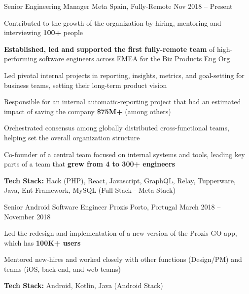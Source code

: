 \documentclass[]{awesome-cv}
\begin{document}
	
\vspace{-8mm}
\begin{cventries}

\vspace{-2mm}

\cventry
	{Senior Engineering Manager}
	{Meta}
	{Spain, Fully-Remote}
	{Nov 2018 – Present}
	{\begin{cvitems}
		\item {Contributed to the growth of the organization by hiring, mentoring and interviewing \textbf{100+} people}
		\item {\textbf{Established, led and supported the first fully-remote team} of high-performing software engineers across EMEA for the Biz Products Eng Org}
		\item {Led pivotal internal projects in reporting, insights, metrics, and goal-setting for business teams, setting their long-term product vision}
		\item {Responsible for an internal automatic-reporting project that had an estimated impact of saving the company \textbf{\$75M+} (among others)}
		\item {Orchestrated consensus among globally distributed cross-functional teams, helping set the overall organization structure}
		\item {Co-founder of a central team focused on internal systems and tools, leading key parts of a team that \textbf{grew from 4 to 300+ engineers}}
		\item {\textbf{Tech Stack:} Hack (PHP), React, Javascript, GraphQL, Relay, Tupperware, Java, Ent Framework, MySQL  (Full-Stack - Meta Stack)}
	\end{cvitems}}

	\vspace{-4mm}
	\cventry
	{Senior Android Software Engineer}
	{Prozis}
	{Porto, Portugal}
	{March 2018 – November 2018}
	{\begin{cvitems}
		\item {Led the redesign and implementation of a new version of the Prozis GO app, which has \textbf{100K+ users}}
		\item {Mentored new-hires and worked closely with other functions (Design/PM) and teams (iOS, back-end, and web teams)}
		\item {\textbf{Tech Stack:} Android, Kotlin, Java (Android Stack)}
	\end{cvitems}}
	


\end{cventries}
\end{document}
